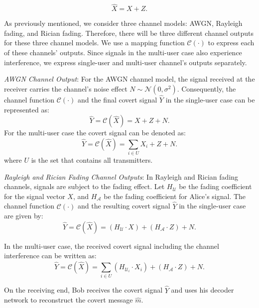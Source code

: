 \begin{equation}
	\hat{X} = X + Z.
\end{equation}

As previously mentioned, we consider three channel models: AWGN, Rayleigh fading, and Rician fading. Therefore, there will be three different channel outputs for these three channel models. We use a mapping function \(\mathcal{C}(\cdot)\) to express each of these channels' outputs. Since signals in the multi-user case also experience interference, we express single-user and multi-user channel's outputs separately.

\textit{AWGN Channel Output}: For the AWGN channel model, the signal received at the receiver carries the channel's noise effect \(N \sim \mathcal{N}(0, \sigma^2)\). Consequently, the channel function \(\mathcal{C}(\cdot)\) and the final covert signal \(\hat{Y}\) in the single-user case can be represented as:
\begin{equation}
	\hat{Y} = \mathcal{C}(\hat{X}) = X + Z + N.
\end{equation}
For the multi-user case the covert signal can be denoted as:
\begin{equation}
	 \hat{Y} = \mathcal{C}(\hat{X}) = \sum_{i \in U}X_i + Z + N.
\end{equation}
where \(U\) is the set that contains all transmitters.

\textit{Rayleigh and Rician Fading Channel Outputs}: In Rayleigh and Rician fading channels, signals are subject to the fading effect. Let \(H_{\mathcal{U}}\) be the fading coefficient for the signal vector \(X\), and \(H_{\mathcal{A}}\) be the fading coefficient for Alice's signal. The channel function \(\mathcal{C}(\cdot)\) and the resulting covert signal \(\hat{Y}\) in the single-user case are given by:
\begin{equation}
	\hat{Y} = \mathcal{C}(\hat{X}) = (H_{\mathcal{U}} \cdot X) + (H_{\mathcal{A}} \cdot Z) + N.
\end{equation}

In the multi-user case, the received covert signal including the channel interference can be written as:
\begin{equation}
	\hat{Y} = \mathcal{C}(\hat{X}) = \sum_{i \in U}(H_{\mathcal{U}_i} \cdot X_i) + (H_{\mathcal{A}} \cdot Z) + N.
\end{equation}

On the receiving end, Bob receives the covert signal \(\hat{Y}\) and uses his decoder network to reconstruct the covert message \(\hat{m}\).

